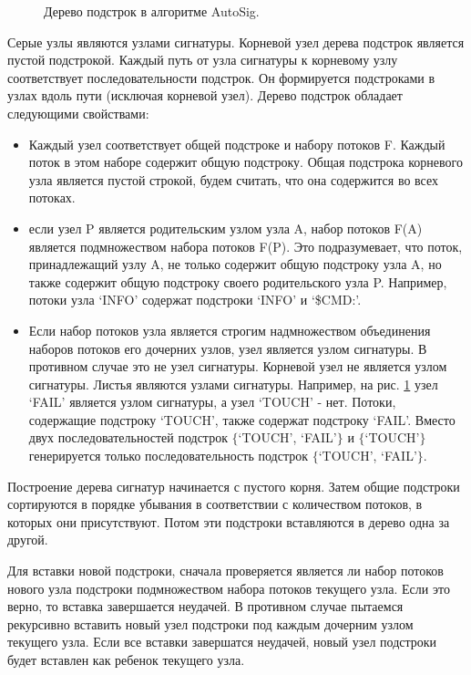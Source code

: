 \begin{figure}[H]
    \begin{center}
        
        \caption{Дерево подстрок в алгоритме AutoSig.}\label{autosig:tree}
    \end{center}
\end{figure}


Серые узлы являются узлами сигнатуры. Корневой узел дерева подстрок является пустой подстрокой.
Каждый путь от узла сигнатуры к корневому узлу соответствует последовательности подстрок.
Он формируется подстроками в узлах вдоль пути (исключая корневой узел).
Дерево подстрок обладает следующими свойствами:

\begin{itemize}
    \item Каждый узел соответствует общей подстроке и набору потоков F.
    Каждый поток в этом наборе содержит общую подстроку.
    Общая подстрока корневого узла является пустой строкой, будем считать, что она содержится во всех потоках.
    \item если узел P является родительским узлом узла A, набор потоков F(A) является подмножеством набора потоков F(P).
    Это подразумевает, что поток, принадлежащий узлу A, не только содержит общую подстроку узла A, но также содержит общую подстроку своего родительского узла P.
    Например, потоки узла `INFO' содержат подстроки `INFO' и `\$CMD:'.
    \item Если набор потоков узла является строгим надмножеством объединения наборов потоков его дочерних узлов, узел является узлом сигнатуры.
    В противном случае это не узел сигнатуры. Корневой узел не является узлом сигнатуры. Листья являются узлами сигнатуры.
    Например, на рис. \ref{autosig:tree} узел `FAIL' является узлом сигнатуры, а узел `TOUCH' - нет.
    Потоки, содержащие подстроку `TOUCH', также содержат подстроку `FAIL'.
    Вместо двух последовательностей подстрок $\{$`TOUCH', `FAIL'$\}$ и $\{$`TOUCH'$\}$
    генерируется только последовательность подстрок $\{$`TOUCH', `FAIL'$\}$.

\end{itemize}

Построение дерева сигнатур начинается с пустого корня.
Затем общие подстроки сортируются в порядке убывания в соответствии с количеством потоков, в которых они присутствуют.
Потом эти подстроки вставляются в дерево одна за другой.

Для вставки новой подстроки, сначала проверяется является ли набор потоков нового узла подстроки
подмножеством набора потоков текущего узла. Если это верно, то вставка завершается неудачей.
В противном случае пытаемся рекурсивно вставить новый узел подстроки под каждым дочерним узлом текущего узла.
Если все вставки завершатся неудачей, новый узел подстроки будет вставлен как ребенок текущего узла.

